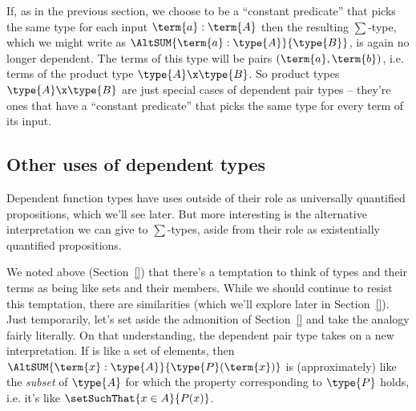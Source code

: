 If, as in the previous section, we choose  to be a ``constant predicate'' that picks the same type  for each input $\term{a}:\term{A}$ then the resulting $\sum$-type, which we might write as
$\AltSUM{\term{a}:\type{A}}{\type{B}}$, is again no longer dependent.  The terms of this type will be pairs $(\term{a}, \term{b})$, i.e. terms of the product type $\type{A} \x \type{B}$.
So product types $\type{A} \x \type{B}$ are just special cases of dependent pair types -- they're ones that have a ``constant predicate'' that picks the same type  for every term of its input.









\subsection{Other uses of dependent types}
\label{sec:Quantifiers-OtherUsesDependentTypes}

Dependent function types have uses outside of their role as universally quantified propositions, which we'll see later.
But more interesting is the alternative interpretation we can give to $\sum$-types, aside from their role as existentially quantified propositions.

We noted above (Section~\ref{}) that there's a temptation to think of types and their terms as being like sets and their members.  While we should continue to resist this temptation, there are similarities (which we'll explore later in Section~\ref{}).
Just temporarily, let's set aside the admonition of Section~\ref{} and
take the analogy fairly literally.  On that understanding, the dependent pair type takes on a new interpretation.  If  is like a set of elements, then
$\AltSUM{\term{x}:\type{A}}{\type{P}(\term{x})}$
is (approximately) like the \emph{subset} of $\type{A}$ for which the property corresponding to $\type{P}$ holds, 
i.e. it's like 
$\setSuchThat{x \in A}{P(x)}$.  

